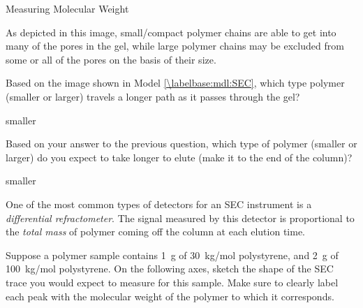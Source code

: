\begin{activity}{Measuring Molecular Weight}
\begin{model}
	As depicted in this image, small/compact polymer chains are able to get into many of the pores in the gel, while large polymer chains may be excluded from some or all of the pores on the basis of their size.

\end{model}

\begin{ctqs}

	\question Based on the image shown in Model \ref{\labelbase:mdl:SEC}, which type polymer (smaller or larger) travels a longer path as it passes through the gel?
	
		\begin{solution}[0.5in]
			smaller
		\end{solution}
	
	\question Based on your answer to the previous question, which type of polymer (smaller or larger) do you expect to take longer to elute (make it to the end of the column)?
	
		\begin{solution}[0.5in]
			smaller
		\end{solution}
	
\end{ctqs}

\begin{infobox}
	One of the most common types of detectors for an SEC instrument is a \emph{differential refractometer}.  The signal measured by this detector is proportional to the \emph{total mass} of polymer coming off the column at each elution time.
\end{infobox}

\clearpage
\begin{ctqs}
	
	\question Suppose a polymer sample contains 1~g of 30~kg/mol polystyrene, and 2~g of 100~kg/mol polystyrene.  On the following axes, sketch the shape of the SEC trace you would expect to measure for this sample.  Make sure to clearly label each peak with the molecular weight of the polymer to which it corresponds.
	
		\begin{solution}[2in]
		\end{solution}
	

\end{ctqs}
\end{activity}

